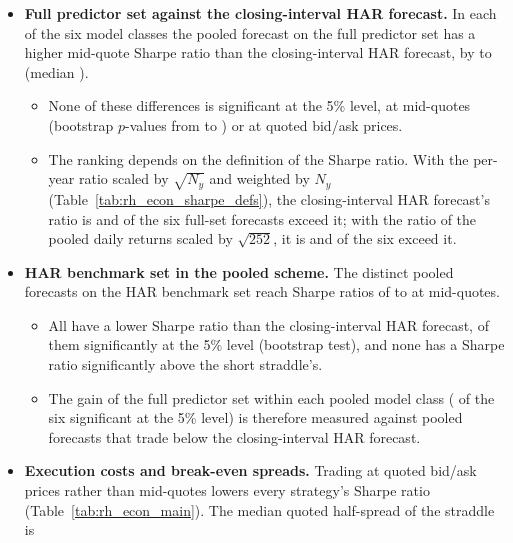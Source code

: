 \begin{itemize}
\begin{itemize}
    at mid-quotes and \rhemFullTXVsShortSigWord{} at quoted bid/ask prices (fixed-$b$ test,
    Section~\ref{sec:rh_methods_tests}).
  \end{itemize}
\item \textbf{Full predictor set against the closing-interval HAR forecast.} In each of the six
  model classes the pooled forecast on the full predictor set has a higher mid-quote Sharpe ratio than the
  closing-interval HAR forecast, by \rhemFullVsCiHarMin{} to \rhemFullVsCiHarMax{} (median \rhemFullVsCiHarMed).
  \begin{itemize}
  \item None of these differences is significant at the 5\% level, at mid-quotes (bootstrap $p$-values from
    \rhemFullVsCiHarPMin{} to \rhemFullVsCiHarPMax) or at quoted bid/ask prices.
  \item The ranking depends on the definition of the Sharpe ratio. With the per-year ratio scaled by $\sqrt{N_y}$ and
    weighted by $N_y$ (Table~\ref{tab:rh_econ_sharpe_defs}), the closing-interval HAR forecast's ratio is
    \rhemShDOneCiHar{} and \rhemFullAboveCiHarDOneWord{} of the six full-set forecasts exceed it; with the ratio of
    the pooled daily returns scaled by $\sqrt{252}$, it is \rhemShDTwoCiHar{} and \rhemFullAboveCiHarDTwoWord{} of
    the six exceed it.
  \end{itemize}
\item \textbf{HAR benchmark set in the pooled scheme.} The \rhemHarDistinctWord{} distinct pooled forecasts on the HAR
  benchmark set reach Sharpe ratios of \rhrPoolShHarMin{} to \rhrPoolShHarMax{} at mid-quotes.
  \begin{itemize}
  \item All \rhemHarDistinctWord{} have a lower Sharpe ratio than the closing-interval HAR forecast,
    \rhemHarVsCiHarSigWord{} of them significantly at the 5\% level (bootstrap test), and none has a Sharpe ratio
    significantly above the short straddle's.
  \item The gain of the full predictor set within each pooled model class (\rhemFullVsHarSigWord{} of the six
    significant at the 5\% level) is therefore measured against pooled forecasts that trade below the
    closing-interval HAR forecast.
  \end{itemize}
\item \textbf{Execution costs and break-even spreads.} Trading at quoted bid/ask prices rather than mid-quotes lowers
  every strategy's Sharpe ratio (Table~\ref{tab:rh_econ_main}). The median quoted half-spread of the straddle is

\end{itemize}
